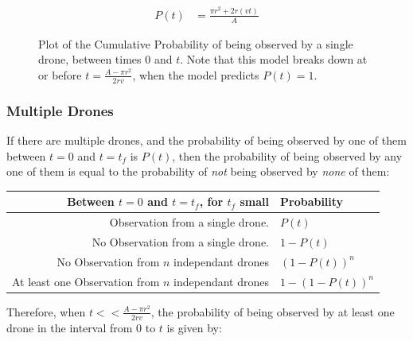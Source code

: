 \documentclass{article}
\begin{document}
\begin{align}
P(t) & = \frac{\pi r^2 + 2 r (v t)}{A}
\end{align}

\begin{figure}[h!]
\begin{centering}
\label{fig:p-plot}
\caption{Plot of the Cumulative Probability of being observed by a single drone,
between times $0$ and $t$.
Note that this model breaks down at or before $t = \frac{ A - \pi r^2 }{2 r v}$,
	when the model predicts $P(t) = 1$.}
\end{centering}
\end{figure}

\subsubsection{Multiple Drones}

If there are multiple drones, and the probability of being observed by one of them between
	$t=0$ and $t=t_f$ is $P(t)$, then the probability of being observed by any one of them
	is equal to the probability of \emph{not} being observed by \emph{none} of them:

\begin{tabular}{r|l}
Between $t = 0$ and $t = t_f$, for $t_f$ small & Probability \\
\hline
Observation from a single drone. & $P(t)$\\
No Observation from a single drone. & $1 - P(t)$ \\
No Observation from $n$ independant drones & $\left(1 - P(t)\right)^n$\\
At least one Observation from $n$ independant drones 
	& $1 - \left( 1 - P(t) \right)^n$\\
\end{tabular}

Therefore, when $t << \frac{A - \pi r^2}{2 r v}$, the probability
	of being observed by at least one drone in the interval from $0$ to $t$
	is given by:
\end{document}
